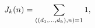 \[\mathop{J_{k}\/}\nolimits\!\left(n\right)=\sum_{\left(\left(d_{1},\dots,d_{k}%
\right),n\right)=1}1,\]